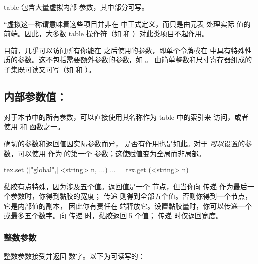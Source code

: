 
 table 包含大量虚拟内部 \TEX 参数，其中部分可写。

``虚拟这一称谓意味着这些项目并非在 \LUA 中正式定义，而只是由元表
处理实际 \TEX 值的前端。因此，大多数 \LUA table 操作符（如  和
\type {#}）对此类项目不起作用。

目前，几乎可以访问所有你能在  之后使用的参数，即单个令牌或在
\TEX 中具有特殊性质的参数。这不包括需要额外参数的参数，如 \type {\the\scriptfont}。
由简单整数和尺寸寄存器组成的子集既可读又可写（如 
和 ）。

\subsection{内部参数值：}



对于本节中的所有参数，可以直接使用其名称作为  table 中的索引来
访问，或者使用  和  函数之一。

确切的参数和返回值因实际参数而异， 是否有作用也是如此。对于
{\em 可以}设置的参数，可以使用  作为  的第一个
参数；这使赋值变为全局而非局部。

\begin{typing}
tex.set (["global",] <string> n, ...)
... = tex.get (<string> n)
\end{typing}

黏胶有点特殊，因为涉及五个值。返回值是一个  节点，但当你向
 传递  作为最后一个参数时，你得到黏胶的宽度；
传递  则得到全部五个值。否则你得到一个节点，它是内部值的副本，
因此你有责任在 \LUA 端释放它。设置黏胶量时，你可以传递一个 
或最多五个数字。向  传递  时，黏胶返回 5 个值；
传递  时仅返回宽度。

\subsubsection{整数参数}

整数参数接受并返回 \LUA 数字。以下为可读写的：

